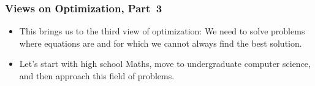 \documentclass[aspectratio=169,mathserif,notheorems]{beamer}%
\begin{document}
%
%
%
%
\begin{frame}%
\frametitle{Views on Optimization, Part~3}%
\begin{itemize}%
%
\item This brings us to the third view of optimization: We need to solve problems where equations are  and for which we cannot always find the best solution.%
%
\item<2-> Let's start with high school Maths, move to undergraduate computer science, and then approach this field of problems.%
\end{itemize}%
\end{frame}%
%
%
%
%
%
%
%
\protected\gdef\aRectangle{{\color{rectangle-color}{\ensuremath{A_{\text{\ding{122}}}}}}}%
\protected\gdef\aRectangleDiff{{\color{rectangle-color}{\ensuremath{A'_{\text{\ding{122}}}}}}}%
\protected\gdef\aRectangleMax{{\color{rectangle-color}{\ensuremath{\widehat{A_{\text{\ding{122}}}}}}}}%
\protected\gdef\aSquare{{\color{square-color}{\ensuremath{A_{\text{\ding{110}}}}}}}%
\protected\gdef\aSmallTriangle{{\color{small-triangle-color}{\ensuremath{A_{\text{\ding{116}}}}}}}%
\protected\gdef\aLargeTriangle{{\color{large-triangle-color}{\ensuremath{A_{\text{\ding{115}}}}}}}%
\protected\gdef\aX{{\color{x-color}{\ensuremath{x}}}}%
\protected\gdef\aXMax{{\color{x-color}{\ensuremath{\hat{x}}}}}%
\protected\gdef\aRectangleOfX{\ensuremath{\aRectangle(\aX)}}%
\protected\gdef\aRectangleOfXDiff{\ensuremath{\aRectangleDiff(\aX)}}%
%
\end{document}
